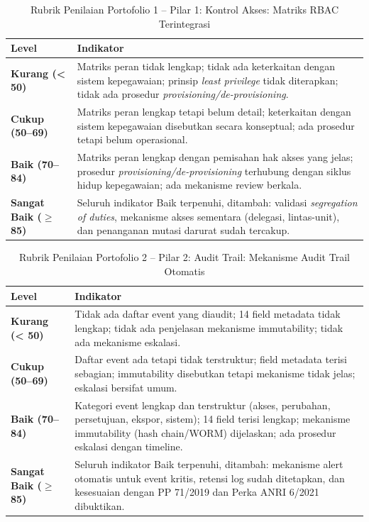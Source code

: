 \documentclass[12pt,a4paper]{report}
\begin{document}
\begin{table}[htbp]
\centering
\small
\caption{Rubrik Penilaian Portofolio 1 -- Pilar 1: Kontrol Akses: Matriks RBAC Terintegrasi}
\label{tab:rubrik-1}
\begin{tabularx}{\textwidth}{@{} l X @{}}
\toprule
\textbf{Level} & \textbf{Indikator} \\
\midrule
\textbf{Kurang (< 50)} & Matriks peran tidak lengkap; tidak ada keterkaitan dengan sistem kepegawaian; prinsip \textit{least privilege} tidak diterapkan; tidak ada prosedur \textit{provisioning/de-provisioning}. \\
\textbf{Cukup (50--69)} & Matriks peran lengkap tetapi belum detail; keterkaitan dengan sistem kepegawaian disebutkan secara konseptual; ada prosedur tetapi belum operasional. \\
\textbf{Baik (70--84)} & Matriks peran lengkap dengan pemisahan hak akses yang jelas; prosedur \textit{provisioning/de-provisioning} terhubung dengan siklus hidup kepegawaian; ada mekanisme review berkala. \\
\textbf{Sangat Baik ($\geq$ 85)} & Seluruh indikator Baik terpenuhi, ditambah: validasi \textit{segregation of duties}, mekanisme akses sementara (delegasi, lintas-unit), dan penanganan mutasi darurat sudah tercakup. \\
\bottomrule
\end{tabularx}
\end{table}

\begin{table}[htbp]
\centering
\small
\caption{Rubrik Penilaian Portofolio 2 -- Pilar 2: Audit Trail: Mekanisme Audit Trail Otomatis}
\label{tab:rubrik-2}
\begin{tabularx}{\textwidth}{@{} l X @{}}
\toprule
\textbf{Level} & \textbf{Indikator} \\
\midrule
\textbf{Kurang (< 50)} & Tidak ada daftar event yang diaudit; 14 field metadata tidak lengkap; tidak ada penjelasan mekanisme immutability; tidak ada mekanisme eskalasi. \\
\textbf{Cukup (50--69)} & Daftar event ada tetapi tidak terstruktur; field metadata terisi sebagian; immutability disebutkan tetapi mekanisme tidak jelas; eskalasi bersifat umum. \\
\textbf{Baik (70--84)} & Kategori event lengkap dan terstruktur (akses, perubahan, persetujuan, ekspor, sistem); 14 field terisi lengkap; mekanisme immutability (hash chain/WORM) dijelaskan; ada prosedur eskalasi dengan timeline. \\
\textbf{Sangat Baik ($\geq$ 85)} & Seluruh indikator Baik terpenuhi, ditambah: mekanisme alert otomatis untuk event kritis, retensi log sudah ditetapkan, dan kesesuaian dengan PP 71/2019 dan Perka ANRI 6/2021 dibuktikan. \\
\bottomrule
\end{tabularx}
\end{table}
\end{document}
